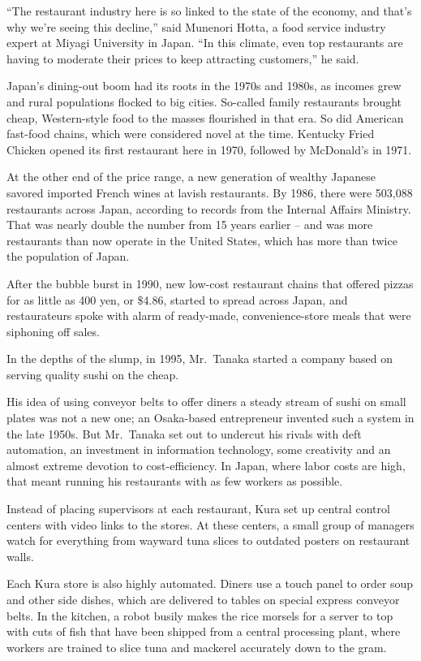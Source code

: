 ﻿\documentclass[12pt]{article}
\begin{document}
``The restaurant industry here is so linked to the state of the economy, and that's why we're seeing
this decline,'' said Munenori Hotta, a food service industry expert at Miyagi University in Japan.
``In this climate, even top restaurants are having to moderate their prices to keep attracting
customers,'' he said.

Japan's dining-out boom had its roots in the 1970s and 1980s, as incomes grew and rural populations
flocked to big cities. So-called family restaurants brought cheap, Western-style food to the masses
flourished in that era. So did American fast-food chains, which were considered novel at the time.
Kentucky Fried Chicken opened its first restaurant here in 1970, followed by McDonald's in 1971.

At the other end of the price range, a new generation of wealthy Japanese savored imported French
wines at lavish restaurants. By 1986, there were 503,088 restaurants across Japan, according to
records from the Internal Affairs Ministry. That was nearly double the number from 15 years earlier
-- and was more restaurants than now operate in the United States, which has more than twice the
population of Japan.

After the bubble burst in 1990, new low-cost restaurant chains that offered pizzas for as little as
400 yen, or \$4.86, started to spread across Japan, and restaurateurs spoke with alarm of
ready-made, convenience-store meals that were siphoning off sales.

In the depths of the slump, in 1995, Mr.~Tanaka started a company based on serving quality sushi on
the cheap.

His idea of using conveyor belts to offer diners a steady stream of sushi on small plates was not a
new one; an Osaka-based entrepreneur invented such a system in the late 1950s. But Mr.~Tanaka set
out to undercut his rivals with deft automation, an investment in information technology, some
creativity and an almost extreme devotion to cost-efficiency. In Japan, where labor costs are high,
that meant running his restaurants with as few workers as possible.

Instead of placing supervisors at each restaurant, Kura set up central control centers with video
links to the stores. At these centers, a small group of managers watch for everything from wayward
tuna slices to outdated posters on restaurant walls.

Each Kura store is also highly automated. Diners use a touch panel to order soup and other side
dishes, which are delivered to tables on special express conveyor belts. In the kitchen, a robot
busily makes the rice morsels for a server to top with cuts of fish that have been shipped from a
central processing plant, where workers are trained to slice tuna and mackerel accurately down to
the gram.
\end{document}
